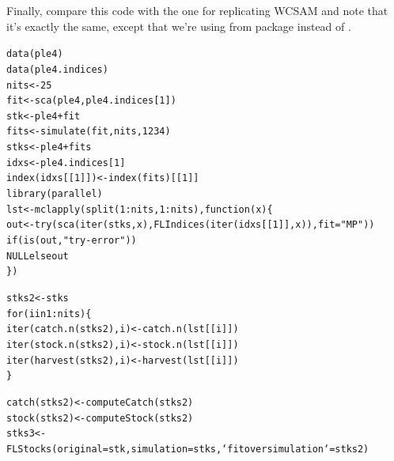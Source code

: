 \documentclass[a4paper,english,10pt]{article}\usepackage[]{graphicx}\usepackage[]{color}
\makeatletter
\newcommand{\hlnum}[1]{\textcolor[rgb]{0.063,0.58,0.627}{#1}}%
\newcommand{\hlstr}[1]{\textcolor[rgb]{0.063,0.58,0.627}{#1}}%
\newcommand{\hlopt}[1]{\textcolor[rgb]{0.196,0.196,0.196}{#1}}%
\newcommand{\hlstd}[1]{\textcolor[rgb]{0.196,0.196,0.196}{#1}}%
\newcommand{\hlkwa}[1]{\textcolor[rgb]{0.231,0.416,0.784}{#1}}%
\newcommand{\hlkwb}[1]{\textcolor[rgb]{0.627,0,0.314}{#1}}%
\newcommand{\hlkwc}[1]{\textcolor[rgb]{0,0.631,0.314}{#1}}%
\newcommand{\hlkwd}[1]{\textcolor[rgb]{0.78,0.227,0.412}{#1}}%
\newenvironment{kframe}{%
 \def\at@end@of@kframe{}%
 \ifinner\ifhmode%
  \def\at@end@of@kframe{\end{minipage}}%
  \begin{minipage}{\columnwidth}%
 \fi\fi%
 \def\FrameCommand##1{\hskip\@totalleftmargin \hskip-\fboxsep
 \colorbox{shadecolor}{##1}\hskip-\fboxsep
     \hskip-\linewidth \hskip-\@totalleftmargin \hskip\columnwidth}%
 \MakeFramed {\advance\hsize-\width
   \@totalleftmargin\z@ \linewidth\hsize
   \@setminipage}}%
 {\par\unskip\endMakeFramed%
 \at@end@of@kframe}
\newenvironment{knitrout}{}{} %
\makeatother
\begin{document}
Finally, compare this code with the one for replicating WCSAM and note that it's exactly the same, except that we're using  from package  instead of .

\begin{knitrout}
\color{fgcolor}\begin{kframe}
\begin{alltt}
\hlkwd{data}\hlstd{(ple4)}
\hlkwd{data}\hlstd{(ple4.indices)}
\hlstd{nits} \hlkwb{<-} \hlnum{25}
\hlstd{fit} \hlkwb{<-} \hlkwd{sca}\hlstd{(ple4, ple4.indices[}\hlnum{1}\hlstd{])}
\hlstd{stk} \hlkwb{<-} \hlstd{ple4} \hlopt{+} \hlstd{fit}
\hlstd{fits} \hlkwb{<-} \hlkwd{simulate}\hlstd{(fit, nits,} \hlnum{1234}\hlstd{)}
\hlstd{stks} \hlkwb{<-} \hlstd{ple4} \hlopt{+} \hlstd{fits}
\hlstd{idxs} \hlkwb{<-} \hlstd{ple4.indices[}\hlnum{1}\hlstd{]}
\hlkwd{index}\hlstd{(idxs[[}\hlnum{1}\hlstd{]])} \hlkwb{<-} \hlkwd{index}\hlstd{(fits)[[}\hlnum{1}\hlstd{]]}
\hlkwd{library}\hlstd{(parallel)}
\hlstd{lst} \hlkwb{<-} \hlkwd{mclapply}\hlstd{(}\hlkwd{split}\hlstd{(}\hlnum{1}\hlopt{:}\hlstd{nits,} \hlnum{1}\hlopt{:}\hlstd{nits),} \hlkwa{function}\hlstd{(}\hlkwc{x}\hlstd{) \{}
    \hlstd{out} \hlkwb{<-} \hlkwd{try}\hlstd{(}\hlkwd{sca}\hlstd{(}\hlkwd{iter}\hlstd{(stks, x),} \hlkwd{FLIndices}\hlstd{(}\hlkwd{iter}\hlstd{(idxs[[}\hlnum{1}\hlstd{]], x)),} \hlkwc{fit} \hlstd{=} \hlstr{"MP"}\hlstd{))}
    \hlkwa{if} \hlstd{(}\hlkwd{is}\hlstd{(out,} \hlstr{"try-error"}\hlstd{))}
        \hlkwa{NULL else} \hlstd{out}
\hlstd{\})}

\hlstd{stks2} \hlkwb{<-} \hlstd{stks}
\hlkwa{for} \hlstd{(i} \hlkwa{in} \hlnum{1}\hlopt{:}\hlstd{nits) \{}
    \hlkwd{iter}\hlstd{(}\hlkwd{catch.n}\hlstd{(stks2), i)} \hlkwb{<-} \hlkwd{catch.n}\hlstd{(lst[[i]])}
    \hlkwd{iter}\hlstd{(}\hlkwd{stock.n}\hlstd{(stks2), i)} \hlkwb{<-} \hlkwd{stock.n}\hlstd{(lst[[i]])}
    \hlkwd{iter}\hlstd{(}\hlkwd{harvest}\hlstd{(stks2), i)} \hlkwb{<-} \hlkwd{harvest}\hlstd{(lst[[i]])}
\hlstd{\}}
\end{alltt}


{\ttfamily\noindent\bfseries{}}\begin{alltt}
\hlkwd{catch}\hlstd{(stks2)} \hlkwb{<-} \hlkwd{computeCatch}\hlstd{(stks2)}
\hlkwd{stock}\hlstd{(stks2)} \hlkwb{<-} \hlkwd{computeStock}\hlstd{(stks2)}
\hlstd{stks3} \hlkwb{<-} \hlkwd{FLStocks}\hlstd{(}\hlkwc{original} \hlstd{= stk,} \hlkwc{simulation} \hlstd{= stks,} \hlkwc{`fit over simulation`} \hlstd{= stks2)}
\end{alltt}
\end{kframe}
\end{knitrout}
\end{document}
